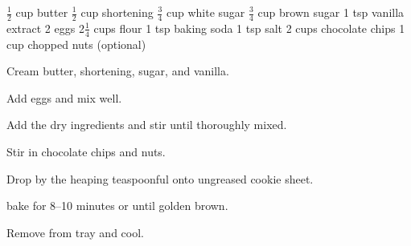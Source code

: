\dishtype{\dessert}
\begin{ingreds}
    $\frac{1}{2}$ cup butter
    $\frac{1}{2}$ cup shortening
    $\frac{3}{4}$ cup white sugar
    $\frac{3}{4}$ cup brown sugar
    1 tsp vanilla extract
    2 eggs
    2$\frac{1}{4}$ cups flour
    1 tsp baking soda
    1 tsp salt
    2 cups chocolate chips
    1 cup chopped nuts (optional)
\end{ingreds}
\begin{method}
    Cream butter, shortening, sugar, and vanilla.\par
    Add eggs and mix well.\par
    Add the dry ingredients and stir until thoroughly mixed.\par
    Stir in chocolate chips and nuts.\par
    Drop by the heaping teaspoonful onto ungreased cookie sheet.\par
    bake for 8--10 minutes or until golden brown.\par
    Remove from tray and cool.
\end{method}
